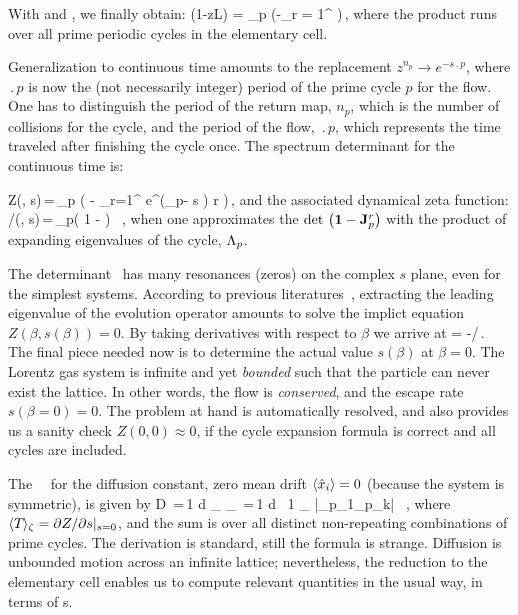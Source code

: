 With  and , we finally
obtain:
\beq
\det(1-z{\cal L}) = \prod_p \exp\left(-\sum_{r =
1}^{\infty}
\right)\,,
\label{eq-det-disc}
\eeq
where the product runs over all prime periodic cycles in the
elementary cell.

Generalization to continuous time amounts to the
replacement $ z^{n_p} \rightarrow e^{-s \period{p}} $, where
$\period{p}$ is now the (not necessarily integer) %
period of the prime cycle $p$ for the flow. One has to distinguish the
period of the return map, $n_p$, which is the number of collisions for
the cycle, and the period of the flow, $\period{p}$, which represents
the time traveled after finishing the cycle once. The spectrum
determinant for the continuous time is:

\beq
Z(\beta, s)\,=\,\prod_{p\in\PP} \exp \left( - {
 \sum_{r=1}^
 { e^{(\beta \cdot \hn_p- s ) r } %
  }
 } \right)\,,
\label{eq-det-cont}
\eeq
and the associated dynamical zeta function:
/\zeta(\beta, s)\,=\,\prod_{p}\left( 1 -  \right) ~,
\label{eq-zeta-cont}
\eeq
when one approximates the $\det\left( {\bf 1}-{\bf J}_p^{r} \right) $ with
the product of expanding eigenvalues of the cycle, $\ExpaEig_p$.

The determinant~ has many resonances
(zeros) on the complex $s$ plane, even for the simplest systems.
According to previous literatures~, extracting the leading
eigenvalue of the evolution operator amounts to solve the implict
equation $Z(\beta, s(\beta)) = 0$. By taking derivatives with respect
to $\beta$ we arrive at
\beq
{} = -/\,.
\eeq
The final piece needed now is to determine the actual value $s(\beta)$
at $\beta = 0$. The Lorentz gas system is infinite and yet
\emph{bounded} such that the particle can never exist the lattice.
In other words, the flow is \emph{conserved}, and the escape rate
$s(\beta = 0) = 0$. The problem at hand is automatically resolved, and
also provides us a sanity check $Z(0, 0)\approx 0$, if the cycle
expansion formula is correct and all cycles are included.

The \dzeta\ \cycForm\ for the diffusion constant, zero mean drift
$ \expct{ \hat{x}_i } = 0 $ (because the system is symmetric), is
given by
 \beq
 D \,=\,{1  d} { _\zeta \over
 \expct{\period{}}_\zeta } \,=\,{1  d } \, {1 \over
 \expct{\period{}}_\zeta} \sumprime {} {|\ExpaEig_{p_1}\cdots \ExpaEig_{p_k}|} \, ,
\label{eq-diff-ec}
\eeq
where $\expct{\period{}}_\zeta = \partial Z/\partial s\vert_{s = 0}$,
and the sum is over all distinct non-repeating combinations of prime
cycles. The derivation is standard, still the formula is strange.
Diffusion is unbounded motion across an infinite lattice;
nevertheless, the reduction to the elementary cell enables us to
compute relevant quantities in the usual way, in terms of \po s.
